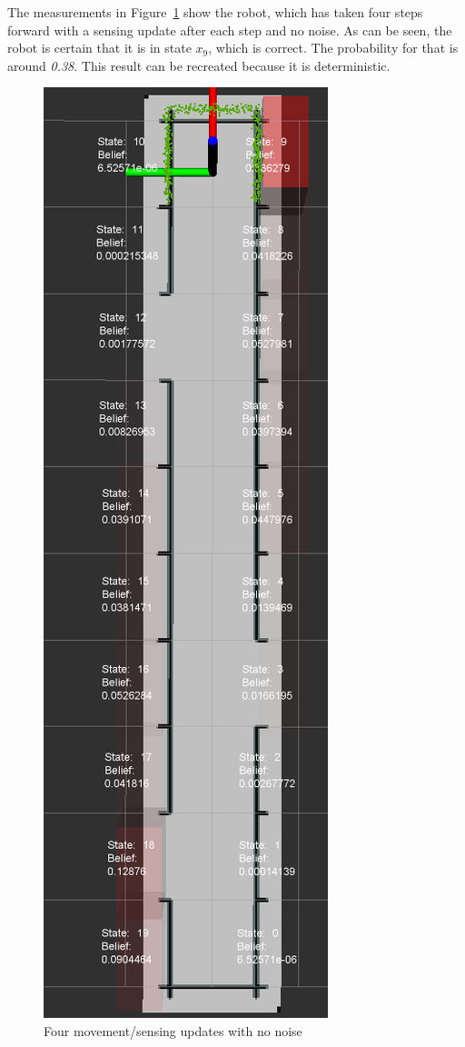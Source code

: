 \documentclass[10pt,a4paper]{article}
\begin{document}
	The measurements in Figure~\ref{fig:4stepsNoNoise} show the robot, which has taken four steps forward with a sensing update after each step and no noise. As can be seen, the robot is certain that it is in state \textit{$x_9$}, which is correct. The probability for that is around \textit{0.38}. This result can be recreated because it is deterministic.
	
\begin{figure}[h]
	\centering
	\includegraphics[scale=0.9]{4stepsforward.png}
	\caption{Four movement/sensing updates with no noise}
	\label{fig:4stepsNoNoise}
\end{figure}
\end{document}

